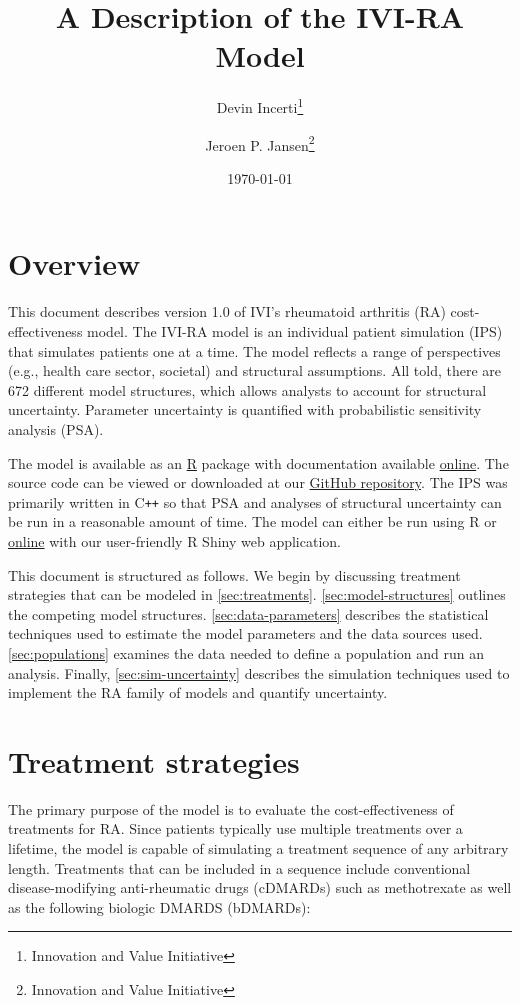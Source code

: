 \documentclass[11pt,final,fleqn]{article}\usepackage[]{graphicx}\usepackage[]{color}
\title{A Description of the IVI-RA Model}
\author{Devin Incerti\footnote{Innovation and Value Initiative} \and Jeroen P. Jansen\footnote{Innovation and Value Initiative}}
\date{\today}
\theoremstyle{plain}
\newcommand\CPP{{C\texttt{++}}}
\newcommand\R{{\textsf{R}}}
\begin{document}
\maketitle

\begingroup
 \hypersetup{linkcolor=black} \tableofcontents
 \listoffigures
 \listoftables
\endgroup



\section{Overview}\label{overview}

This document describes version 1.0 of IVI's rheumatoid arthritis (RA) cost-effectiveness model. The IVI-RA model is an individual patient simulation (IPS) that simulates patients one at a time. The model reflects a range of perspectives (e.g., health care sector, societal) and structural assumptions. All told, there are 672 different model structures, which allows analysts to account for structural uncertainty. Parameter uncertainty is quantified with probabilistic sensitivity analysis (PSA).

The model is available as an \href{https://cran.r-project.org/}{\R{}} package with documentation available \href{https://innovationvalueinitiative.github.io/IVI-RA/index.html}{online}. The source code can be viewed or downloaded at our \href{https://github.com/InnovationValueInitiative/IVI-RA}{GitHub repository}. The IPS was primarily written in \CPP{} so that PSA and analyses of structural uncertainty can be run in a reasonable amount of time. The model can either be run using \R{} or \href{http://www.shinyapps.io/}{online} with our user-friendly R Shiny web application. 

This document is structured as follows. We begin by discussing treatment strategies that can be modeled in \autoref{sec:treatments}. \autoref{sec:model-structures} outlines the competing model structures. \autoref{sec:data-parameters} describes the statistical techniques used to estimate the model parameters and the data sources used. \autoref{sec:populations} examines the data needed to define a population and run an analysis. Finally, \autoref{sec:sim-uncertainty} describes the simulation techniques used to implement the RA family of models and quantify uncertainty.

\section{Treatment strategies}\label{sec:treatments}
The primary purpose of the model is to evaluate the cost-effectiveness of treatments for RA. Since patients typically use multiple treatments over a lifetime, the model is capable of simulating a treatment sequence of any arbitrary length. Treatments that can be included in a sequence include conventional disease-modifying anti-rheumatic drugs (cDMARDs) such as methotrexate as well as the following biologic DMARDS (bDMARDs):
\end{document}
